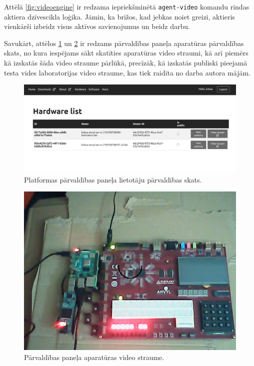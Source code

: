 Attēlā \ref{fig:videoengine} ir redzama iepriekšminētā \lstinline!agent-video!
komandu rindas aktiera dzīvescikla loģika. Jāmin, ka brīžos, kad jebkas noiet
greizi, aktieris vienkārši izbeidz visus aktīvos savienojumus un beidz darbu.

Savukārt, attēlos \ref{fig:mgmtpanelhw} un \ref{fig:hwstream} ir redzams
pārvaldības paneļa aparatūras pārvaldības skats, no kura iespējams sākt
skatīties aparatūras video straumi, kā arī piemērs kā izskatās šāda video
straume pārlūkā, precīzāk, kā izskatās publiski pieejamā
\cite{VeinbahsKrisjanisProduction} testa vides laboratorijas video straume, kas
tiek raidīta no darba autora mājām.

\begin{figure}[H]
    \includegraphics[width=0.9\linewidth]{assets/mgmt-panel-hw-gray.png}
    \centering
    \caption{Platformas pārvaldības paneļa lietotāju pārvaldības skats.}
    \label{fig:mgmtpanelhw}
\end{figure}

\begin{figure}[H]
    \includegraphics[width=0.9\linewidth]{assets/webcam-usage.png}
    \centering
    \caption{Pārvaldības paneļa aparatūras video straume.}
    \label{fig:hwstream}
\end{figure}

